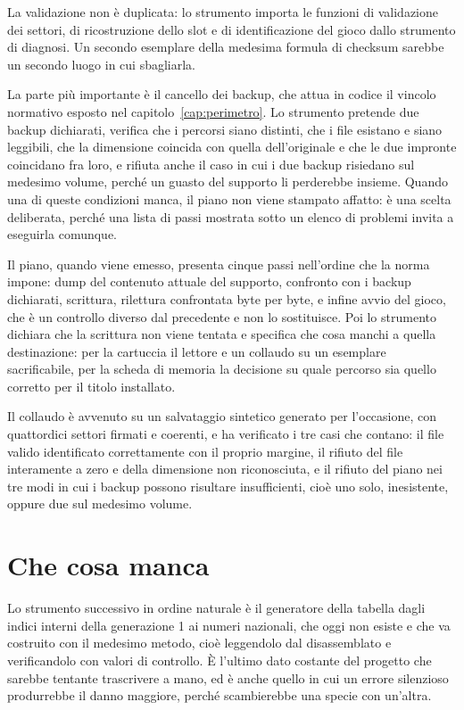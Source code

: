 La validazione non è duplicata: lo strumento importa le funzioni di validazione dei settori, di ricostruzione dello slot e di identificazione del gioco dallo strumento di diagnosi. Un secondo esemplare della medesima formula di checksum sarebbe un secondo luogo in cui sbagliarla.

La parte più importante è il cancello dei backup, che attua in codice il vincolo normativo esposto nel capitolo~\ref{cap:perimetro}. Lo strumento pretende due backup dichiarati, verifica che i percorsi siano distinti, che i file esistano e siano leggibili, che la dimensione coincida con quella dell'originale e che le due impronte coincidano fra loro, e rifiuta anche il caso in cui i due backup risiedano sul medesimo volume, perché un guasto del supporto li perderebbe insieme. Quando una di queste condizioni manca, il piano non viene stampato affatto: è una scelta deliberata, perché una lista di passi mostrata sotto un elenco di problemi invita a eseguirla comunque.

Il piano, quando viene emesso, presenta cinque passi nell'ordine che la norma impone: dump del contenuto attuale del supporto, confronto con i backup dichiarati, scrittura, rilettura confrontata byte per byte, e infine avvio del gioco, che è un controllo diverso dal precedente e non lo sostituisce. Poi lo strumento dichiara che la scrittura non viene tentata e specifica che cosa manchi a quella destinazione: per la cartuccia il lettore e un collaudo su un esemplare sacrificabile, per la scheda di memoria la decisione su quale percorso sia quello corretto per il titolo installato.

Il collaudo è avvenuto su un salvataggio sintetico generato per l'occasione, con quattordici settori firmati e coerenti, e ha verificato i tre casi che contano: il file valido identificato correttamente con il proprio margine, il rifiuto del file interamente a zero e della dimensione non riconosciuta, e il rifiuto del piano nei tre modi in cui i backup possono risultare insufficienti, cioè uno solo, inesistente, oppure due sul medesimo volume.

\section{Che cosa manca}

Lo strumento successivo in ordine naturale è il generatore della tabella dagli indici interni della generazione 1 ai numeri nazionali, che oggi non esiste e che va costruito con il medesimo metodo, cioè leggendolo dal disassemblato e verificandolo con valori di controllo. È l'ultimo dato costante del progetto che sarebbe tentante trascrivere a mano, ed è anche quello in cui un errore silenzioso produrrebbe il danno maggiore, perché scambierebbe una specie con un'altra.
